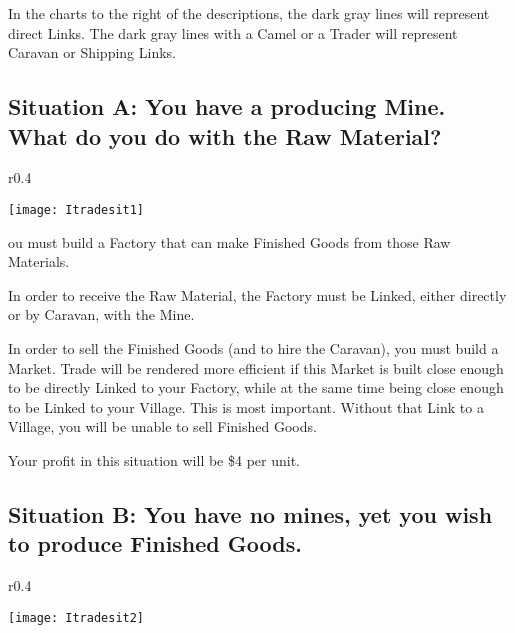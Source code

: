 In the charts to the right of the descriptions, the dark gray lines will represent direct Links. The dark gray lines with a Camel or a Trader will represent Caravan or Shipping Links.

\clearpage

\subsection{Situation A: You have a producing Mine. What do you do with the Raw Material?}

\begin{wrapfigure}{r}{0.4\textwidth}
	\vspace{-20pt}
	\begin{center}
		\texttt{[image: Itradesit1]} %
	\end{center}
	\vspace{-20pt}
\end{wrapfigure}

ou must build a Factory that can make Finished Goods from those Raw Materials.

In order to receive the Raw Material, the Factory must be Linked, either directly or by Caravan, with the Mine.


In order to sell the Finished Goods (and to hire the Caravan), you must build a Market. Trade will be rendered more efficient if this Market is built close enough to be directly Linked to your Factory, while at the same time being close enough to be Linked to your Village. This is most important. Without that Link to a Village, you will be unable to sell Finished Goods.

Your profit in this situation will be \$4 per unit.

\clearpage

\subsection{Situation B: You have no mines, yet you wish to produce Finished Goods.}

\begin{wrapfigure}{r}{0.4\textwidth}
	\vspace{-20pt}
	\begin{center}
		\texttt{[image: Itradesit2]} %
	\end{center}
	\vspace{-20pt}
\end{wrapfigure}

